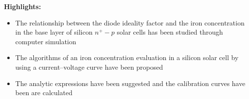 \documentclass[preprint]{elsarticle}
\begin{document}
\textbf{Highlights:}

\begin{itemize}
  \item The relationship between the diode ideality factor and the iron concentration in the base layer of silicon $n^+-p$ solar cells has been studied through computer simulation
  \item The algorithms of an iron concentration evaluation in a silicon solar cell by using a current--voltage curve have been proposed
  \item The analytic expressions have been suggested and the calibration curves have been are calculated
\end{itemize}
\end{document}
